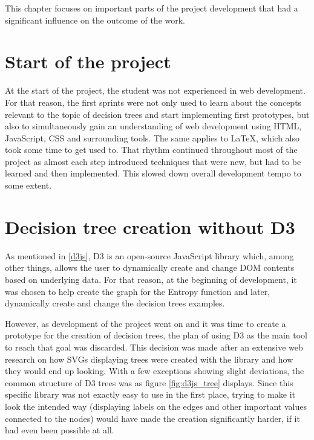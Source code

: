  \label{relevant_aspects}

This chapter focuses on important parts of the project development that had a significant influence on the outcome of the work.

\section{Start of the project}
At the start of the project, the student was not experienced in web development. For that reason, the first sprints were not only used to learn about the concepts relevant to the topic of decision trees and start implementing first prototypes, but also to simultaneously gain an understanding of web development using HTML, JavaScript, CSS and surrounding tools. The same applies to LaTeX, which also took some time to get used to. That rhythm continued throughout most of the project as almost each step introduced techniques that were new, but had to be learned and then implemented. This slowed down overall development tempo to some extent.

\section{Decision tree creation without D3}
As mentioned in \ref{d3js}, D3 is an open-source JavaScript library which, among other things, allows the user to dynamically create and change DOM contents based on underlying data. For that reason, at the beginning of development, it was chosen to help create the graph for the Entropy function and later, dynamically create and change the decision trees examples.

However, as development of the project went on and it was time to create a prototype for the creation of decision trees, the plan of using D3 as the main tool to reach that goal was discarded. This decision was made after an extensive web research on how SVGs displaying trees were created with the library and how they would end up looking. With a few exceptions showing slight deviations, the common structure of D3 trees was as figure \ref{fig:d3js_tree} displays.
Since this specific library was not exactly easy to use in the first place, trying to make it look the intended way (displaying labels on the edges and other important values connected to the nodes) would have made the creation significantly harder, if it had even been possible at all.

